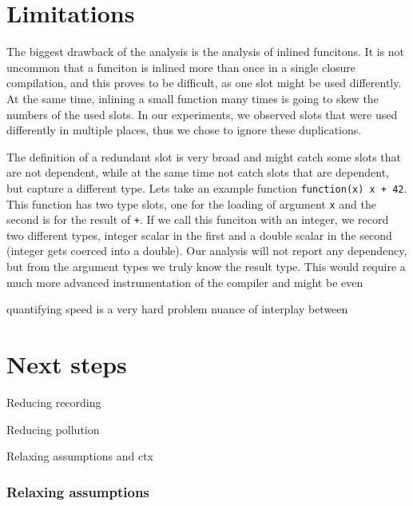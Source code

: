 \section{Limitations}

The biggest drawback of the analysis is the analysis of inlined funcitons. It is not uncommon that a funciton is inlined more than once in a single closure compilation, and this proves to be difficult, as one slot might be used differently. At the same time, inlining a small function many times is going to skew the numbers of the used slots. In our experiments, we observed  slots that were used differently in multiple places, thus we chose to ignore these duplications.

The definition of a redundant slot is very broad and might catch some slots that are not dependent, while at the same time not catch slots that are dependent, but capture a different type. Lets take an example function \texttt{function(x) x + 42}. This function has two type slots, one for the loading of argument \texttt{x} and the second is for the result of \texttt{+}. If we call this funciton with an integer, we record two different types, integer scalar in the first and a double scalar in the second (integer gets coerced into a double). Our analysis will not report any dependency, but from the argument types we truly know the result type. This would require a much more advanced instrumentation of the compiler and might be even

quantifying speed is a very hard problem
nuance of interplay between

\section{Next steps}

Reducing recording

Reducing pollution

Relaxing assumptions and ctx

\subsubsection*{Relaxing assumptions}

